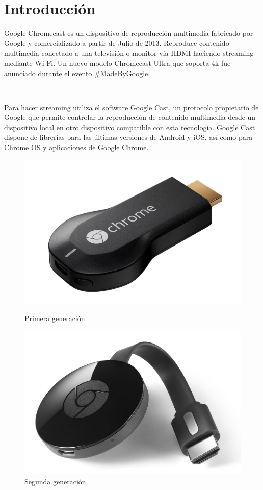 \section{Introducción}
Google Chromecast es un dispositivo de reproducción multimedia fabricado por Google y comercializado a partir de Julio de 2013. Reproduce contenido multimedia conectado a una televisión o monitor vía HDMI haciendo streaming mediante Wi-Fi. Un nuevo modelo Chromecast Ultra que soporta 4k fue anunciado durante el evento \#MadeByGoogle.

\

Para hacer streaming utiliza el software Google Cast, un protocolo propietario de Google que permite controlar la reproducción de contenido multimedia desde un dispositivo local en otro dispositivo compatible con esta tecnología. Google Cast dispone de librerías para las últimas versiones de Android y iOS, así como para Chrome OS y aplicaciones de Google Chrome.

\begin{figure}[h]
	\centering
	\begin{minipage}[b]{.35\textwidth}
		\includegraphics[scale=0.13]{./Imagenes/chromecast1gen.jpg}
		\caption{Primera generación}\label{fig:1gen}
	\end{minipage}\qquad
	\hspace{1cm}
	\begin{minipage}[b]{.35\textwidth}
		\includegraphics[scale=0.18]{./Imagenes/Chromecast.jpg}
		\caption{Segunda generación}\label{fig:2gen}
	\end{minipage}
\end{figure}

